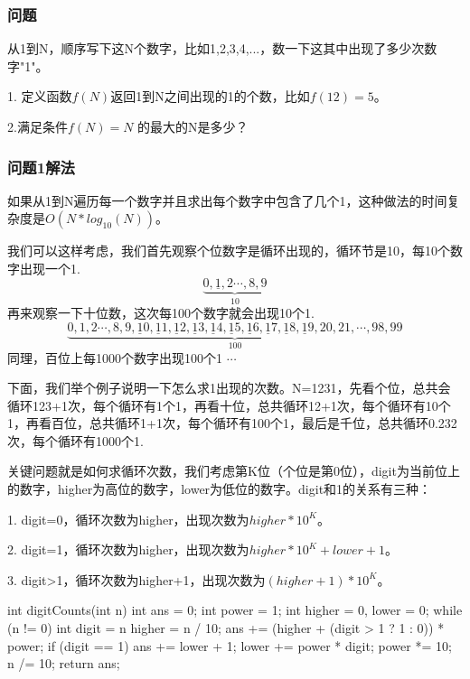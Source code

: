 \subsubsection{问题}
从1到N，顺序写下这N个数字，比如1,2,3,4,...，数一下这其中出现了多少次数字"1"。

1. 定义函数$f(N)$返回1到N之间出现的1的个数，比如$f(12)=5$。

2.满足条件$f(N) = N$ 的最大的N是多少？

\subsubsection{问题1解法}
如果从1到N遍历每一个数字并且求出每个数字中包含了几个1，这种做法的时间复杂度是$O(N*log_{10}(N))$。

我们可以这样考虑，我们首先观察个位数字是循环出现的，循环节是10，每10个数字出现一个1.
\[\underbrace {0, \underline{1}, 2 \cdots , 8, 9}_{10}\]
再来观察一下十位数，这次每100个数字就会出现10个1.
\[\underbrace {0, 1, 2 \cdots , 8, 9, \underline{1}0, \underline{1}1, \underline{1}2, \underline{1}3, \underline{1}4, \underline{1}5, \underline{1}6, \underline{1}7, \underline{1}8, \underline{1}9, 20, 21, \cdots , 98, 99}_{100}\]
同理，百位上每1000个数字出现100个1 $\cdots$

下面，我们举个例子说明一下怎么求1出现的次数。N=1231，先看个位，总共会循环123+1次，每个循环有1个1，再看十位，总共循环12+1次，每个循环有10个1，再看百位，总共循环1+1次，每个循环有100个1，最后是千位，总共循环0.232次，每个循环有1000个1.

关键问题就是如何求循环次数，我们考虑第K位（个位是第0位），digit为当前位上的数字，higher为高位的数字，lower为低位的数字。digit和1的关系有三种：

1. digit=0，循环次数为higher，出现次数为$higher*10^K$。

2. digit=1，循环次数为higher，出现次数为$higher*10^K+lower+1$。

3. digit>1，循环次数为higher+1，出现次数为$(higher+1)*10^K$。


\begin{Codex}[label={[$O(log10(N))+O(1)$]Chap02_04_Ones.java}]
int digitCounts(int n) {
    int ans = 0;
    int power = 1;
    int higher = 0, lower = 0;
    while (n != 0) {
        int digit = n %
        higher = n / 10;
        ans += (higher + (digit > 1 ? 1 : 0)) * power;
        if (digit == 1) {
            ans += lower + 1;
        }
        lower += power * digit;
        power *= 10;
        n /= 10;
    }
    return ans;
}
\end{Codex}

